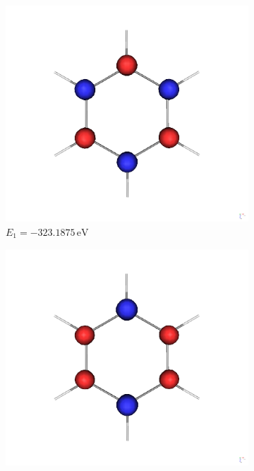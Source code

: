 \documentclass[9pt]{report}
\begin{document}
\newpage
\begin{figure}[H]
	\centering
	\begin{subfigure}[b]{0.23\textwidth}  
		\centering 
		\includegraphics[width=\textwidth]{Benzol-1.png}
		\caption[]{{\small $E_1=-323.1875\,\mathrm{eV}$}}    
	\end{subfigure}
	\hfill
	\begin{subfigure}[b]{0.23\textwidth}
		\centering
		\includegraphics[width=\textwidth]{Benzol-2.png}

\end{subfigure}
\end{figure}
\end{document}
